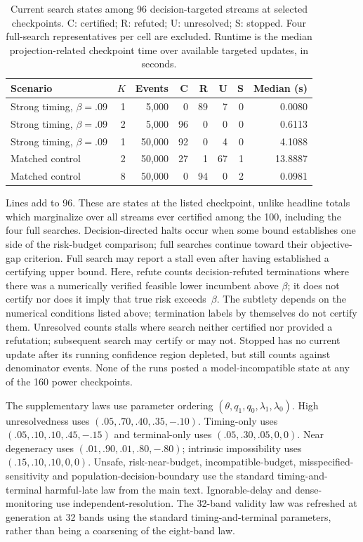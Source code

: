 \Needspace{6.5in} 

\begin{table}[!htbp]\centering\small
\caption{Current search states among 96 decision-targeted streams at selected checkpoints. C: certified; R: refuted; U: unresolved; S: stopped. Four full-search representatives per cell are excluded. Runtime is the median projection-related checkpoint time over available targeted updates, in seconds.}\label{tab:searchstates}
\begin{tabular}{lrrrrrrr}\toprule
Scenario & $K$ & Events & C & R & U & S & Median (s)\\\midrule
Strong timing, $\beta=.09$ & 1 & 5,000 & 0 & 89 & 7 & 0 & 0.0080\\
Strong timing, $\beta=.09$ & 2 & 5,000 & 96 & 0 & 0 & 0 & 0.6113\\
Strong timing, $\beta=.09$ & 1 & 50,000 & 92 & 0 & 4 & 0 & 4.1088\\
Matched control & 2 & 50,000 & 27 & 1 & 67 & 1 & 13.8887\\
Matched control & 8 & 50,000 & 0 & 94 & 0 & 2 & 0.0981\\
\bottomrule\end{tabular}
\end{table}

Lines add to 96. These are states at the listed checkpoint, unlike headline totals which marginalize over all streams ever certified among the 100, including the four full searches. Decision-directed halts occur when some bound establishes one side of the risk-budget comparison; full searches continue toward their objective-gap criterion. Full search may report a stall even after having established a certifying upper bound. Here, refute counts decision-refuted terminations where there was a numerically verified feasible lower incumbent above $\beta$; it does not certify nor does it imply that true risk exceeds~$\beta$. The subtlety depends on the numerical conditions listed above; termination labels by themselves do not certify them. Unresolved counts stalls where search neither certified nor provided a refutation; subsequent search may certify or may not. Stopped has no current update after its running confidence region depleted, but still counts against denominator events. None of the runs posted a model-incompatible state at any of the 160 power checkpoints.
{\sloppy The supplementary laws use parameter ordering $(\theta,q_1,q_0,\lambda_1,\lambda_0)$. High unresolvedness uses $(.05,.70,.40,.35,-.10)$. Timing-only uses $(.05,.10,.10,.45,-.15)$ and terminal-only uses $(.05,.30,.05,0,0)$. Near degeneracy uses $(.01,.90,.01,.80,-.80)$; intrinsic impossibility uses $(.15,.10,.10,0,0)$. Unsafe, risk-near-budget, incompatible-budget, misspecified-sensitivity and population-decision-boundary use the standard timing-and-terminal harmful-late law from the main text. Ignorable-delay and dense-monitoring use independent-resolution. 
The 32-band validity law was refreshed at generation at 32 bands using the standard timing-and-terminal parameters, rather than being a coarsening of the eight-band law.\par}



